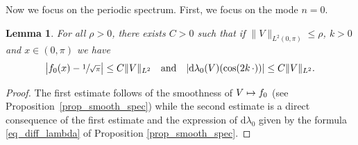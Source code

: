 \documentclass[11pt]{article}
\newcommand\mto{\mathchoice{\longmapsto}{\mapsto}{\mapsto}{\mapsto}}
\newtheorem{lemma}[theorem]{Lemma}
\theoremstyle{definition}
\begin{document}
Now we focus on the periodic spectrum. First, we focus on the mode $n=0$.
\begin{lemma}
\label{lem_mode0}
For all $\rho>0$, there exists $C>0$ such that if $\|V\|_{L^2(0,\pi)}\leq \rho$, $k>0$ and $x\in (0,\pi)$ we have
\[
\big|f_0(x) - \sfrac1{\sqrt\pi}\big|\leq C \| V\|_{L^2} \quad \text{and} \quad |\mathrm{d}\lambda_0(V)(\cos(2k \, \cdot ))| \leq C \| V\|_{L^2}.
\]
\end{lemma}
\begin{proof} The first estimate follows of the smoothness of $V \mto f_0$ (see Proposition~\ref{prop_smooth_spec}) while the second estimate is a direct consequence of the first estimate and the expression of $\mathrm{d}\lambda_0$ given by the formula \eqref{eq_diff_lambda} of Proposition \ref{prop_smooth_spec}.
\end{proof}
\end{document}
